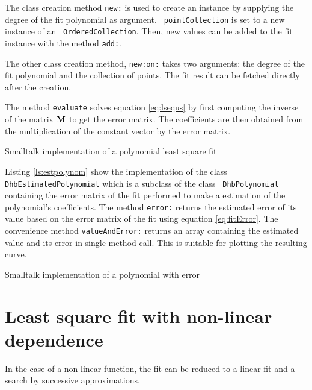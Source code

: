\documentclass[twoside]{book}
\begin{document}
The class creation method {\tt new:} is used to create an instance
by supplying the degree of the fit polynomial as argument. {\tt
pointCollection} is set to a new instance of an {\tt
OrderedCollection}. Then, new values can be added to the fit
instance with the method {\tt add:}.

The other class creation method, {\tt new:on:} takes two
arguments: the degree of the fit polynomial and the collection of
points. The fit result can be fetched directly after the creation.

The method {\tt evaluate} solves equation \ref{eq:lsequs} by first
computing the inverse of the matrix ${\bf M}$ to get the error
matrix. The coefficients are then obtained from the multiplication
of the constant vector by the error matrix.
\begin{listing} Smalltalk implementation of a polynomial least square fit \label{ls:lspolynom}

\end{listing}

Listing \ref{ls:estpolynom} show the implementation of the class
{\tt DhbEstimatedPolynomial} which is a subclass of the class {\tt
DhbPolynomial} containing the error matrix of the fit performed to
make a estimation of the polynomial's coefficients. The method
{\tt error:} returns the estimated error of its value based on the
error matrix of the fit using equation \ref{eq:fitError}. The
convenience method {\tt valueAndError:} returns an array
containing the estimated value and its error in single method
call. This is suitable for plotting the resulting curve.

\begin{listing} Smalltalk implementation of a polynomial with error \label{ls:estpolynom}

\end{listing}


\section{Least square fit with non-linear dependence}
\label{sec:lsfnonlin} In the case of a non-linear function, the
fit can be reduced to a linear fit and a search by successive
approximations.
\end{document}
